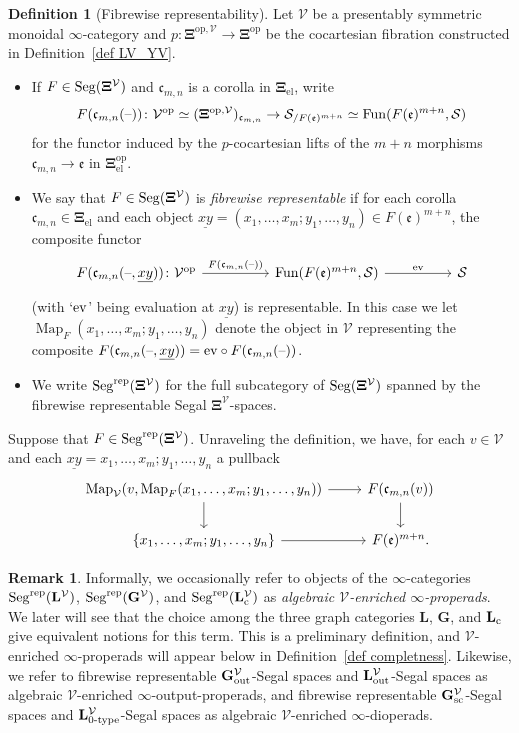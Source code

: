 \documentclass{amsart}
\numberwithin{theorem}{subsection}
\theoremstyle{definition}
\newtheorem{definition}[theorem]{Definition}
\newtheorem{remark}[theorem]{Remark}
\providecommand{\op}{\mathrm{op}}
\providecommand{\xel}{\mathrm{el}}
\newcommand{\xFun}{\operatorname{Fun}}
\newcommand{\xMap}{\operatorname{Map}}
\newcommand{\Map}{\operatorname{Map}}
\newcommand{\xS}{\mathcal{S}}
\newcommand{\xV}{\mathcal{V}}
\newcommand{\xfe}{\mathfrak{e}}
\newcommand{\xfc}{\mathfrak{c}}
\newcommand{\icat}{$\infty$-category}
\newcommand{\name}[1]{\ensuremath{\text{\textup{#1}}}}
\newcommand{\levelg}{\mathbf{L}}
\newcommand{\levelV}{\levelg^\xV}
\newcommand{\levelgconn}{\levelg_{\name{c}}}
\newcommand{\levelcV}{\levelgconn^{\xV}}
\newcommand{\bbY}{\mathbf{G}}
\newcommand{\bbYout}{\bbY_{\name{out}}}
\newcommand{\bbYV}{\bbY^{\xV}}
\newcommand{\gc}{\mathbf{\Xi}}
\newcommand{\gcel}{\gc_{\xel}}
\newcommand{\gcV}{\gc^{\xV}}
\newcommand{\opgcV}{\gc^{\op,\xV}}
\newcommand{\Seg}{\name{Seg}}
\newcommand{\blank}{\text{\textendash}}
\newcommand{\Segrep}{\Seg^{\name{rep}}}
\begin{document}
\begin{definition}[Fibrewise representability]\label{def cts Seg psh}
Let $\xV$ be a presentably symmetric monoidal \icat{} and $p\colon \opgcV\to \gc^\op$ be the cocartesian fibration constructed in Definition~\ref{def LV_YV}.
\begin{itemize}
\item If $F \in \Seg(\gcV)$ and $\xfc_{m,n}$ is a corolla in $\gcel$, write 
\[ F(\xfc_{m, n} (\blank))\colon \xV^\op \simeq (\opgcV)_{\xfc_{m,n}} \to \xS_{/F(\xfe)^{m+n}}\simeq \xFun(F(\xfe)^{m+n}, \xS)\]
for the functor induced by the $p$-cocartesian lifts of the $m+n$ morphisms $\xfc_{m, n}\to \xfe$ in $\gcel^\op$.
\item We say that $F\in \Seg(\gcV)$ is \emph{fibrewise representable} if for each corolla $\xfc_{m,n} \in \gcel$ and each object $\underline{xy} = (x_1,\dots,x_m;y_1,\dots,y_n) \in F(\mathfrak e)^{m+n}$, the composite functor
\[ \begin{tikzcd}[column sep=huge]
F(\xfc_{m, n} (\blank, \underline{xy})) \colon
\xV^\op \rar{F(\xfc_{m, n} (\blank))} & \xFun(F(\xfe)^{m+n}, \xS) \rar{\name{ev}} & \xS
\end{tikzcd} \]
(with `$\name{ev}$' being evaluation at $\underline{xy}$) is representable.
In this case we let $\xMap_F(x_1,\ldots, x_m;y_1, \ldots, y_n)$ denote the object in $\xV$ representing the composite $F(\xfc_{m, n} (\blank, \underline{xy})) = \name{ev} \circ F(\xfc_{m, n} (\blank))$.
	\item We write $\Segrep(\gcV)$ for the full subcategory of $\Seg(\gcV)$ spanned by the fibrewise representable Segal $\gcV$-spaces.
\end{itemize}
\end{definition}


Suppose that $F\in \Segrep(\gcV)$.
Unraveling the definition, we have, for each $v\in \xV$ and each $\underline{xy} = x_1,\ldots, x_m;y_1, \ldots, y_n$ a pullback 
\[ \begin{tikzcd}
\Map_{\xV}(v, \xMap_F(x_1,\ldots, x_m;y_1, \ldots, y_n)) \rar \dar  & F(\xfc_{m,n}(v)) \dar \\
\{ x_1,\ldots, x_m;y_1, \ldots, y_n \} \rar & F(\xfe)^{m+n}.
\end{tikzcd} \]

\begin{remark}
Informally, we occasionally refer to objects of the $\infty$-categories 
$\Segrep(\levelV)$, $\Segrep(\bbYV)$, and $\Segrep(\levelcV)$ as \emph{algebraic $\xV$-enriched $\infty$-properads}.
We later will see that the choice among the three graph categories $\levelg$, $\bbY$, and $\levelgconn$ give equivalent notions for this term.
This is a preliminary definition, and $\xV$-enriched $\infty$-properads will appear below in Definition~\ref{def completness}.
Likewise, we refer to fibrewise representable $\bbYout^\xV$-Segal spaces and $\levelg_{\name{out}}^\xV$-Segal spaces as algebraic $\xV$-enriched $\infty$-output-properads, and fibrewise representable $\bbY_{\name{sc}}^\xV$-Segal spaces and $\levelg_{\name{0-type}}^\xV$-Segal spaces as algebraic $\xV$-enriched $\infty$-dioperads.
\end{remark}
\end{document}
